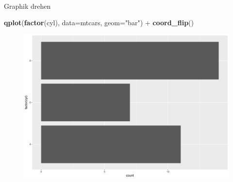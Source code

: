 \documentclass[ignorenonframetext,]{beamer}
\newenvironment{Shaded}{}{}
\newcommand{\KeywordTok}[1]{\textcolor[rgb]{0.00,0.44,0.13}{\textbf{{#1}}}}
\newcommand{\DataTypeTok}[1]{\textcolor[rgb]{0.56,0.13,0.00}{{#1}}}
\newcommand{\StringTok}[1]{\textcolor[rgb]{0.25,0.44,0.63}{{#1}}}
\newcommand{\NormalTok}[1]{{#1}}
\begin{document}
\begin{frame}[fragile]{Graphik drehen}

\begin{Shaded}
\begin{Highlighting}[]
\KeywordTok{qplot}\NormalTok{(}\KeywordTok{factor}\NormalTok{(cyl), }\DataTypeTok{data=}\NormalTok{mtcars, }\DataTypeTok{geom=}\StringTok{"bar"}\NormalTok{) +}\StringTok{ }
\KeywordTok{coord_flip}\NormalTok{()}
\end{Highlighting}
\end{Shaded}

\begin{figure}[htbp]
\centering
\includegraphics{RSocialScience2_files/figure-beamer/unnamed-chunk-17-1.pdf}
\caption{}
\end{figure}

\end{frame}
\end{document}
